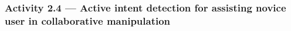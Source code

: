 \documentclass[letterpaper, 11 pt, onecolumn]{article}
\newcommand{\zhi}[1]{\textcolor{blue}{ZL: #1}}
\newcommand{\jie}[1]{\textcolor{green}{JF: #1}}
\begin{document}







\subsubsection{Activity 2.4 --- Active intent detection for assisting novice user in collaborative manipulation}\label{sec:plan-intent-ActiveIntent}
\end{document}
